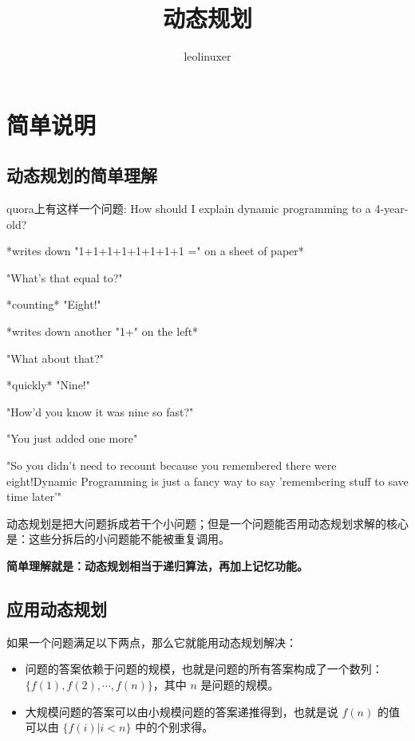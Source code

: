 \documentclass[12pt]{article}
\title{动态规划}
\author{leolinuxer}
\begin{document}
\maketitle
\tableofcontents

\section{简单说明}
\subsection{动态规划的简单理解 \cite{Simple_DynamicProgramming}}
quora上有这样一个问题: How should I explain dynamic programming to a 4-year-old?

*writes down "1+1+1+1+1+1+1+1 =" on a sheet of paper*

"What's that equal to?"

*counting* "Eight!"

*writes down another "1+" on the left*

"What about that?"

*quickly* "Nine!"

"How'd you know it was nine so fast?"

"You just added one more"

"So you didn't need to recount because you remembered there were eight!Dynamic Programming is just a fancy way to say 'remembering stuff to save time later'"

动态规划是把大问题拆成若干个小问题；但是一个问题能否用动态规划求解的核心是：这些分拆后的小问题能不能被重复调用。

\textbf{简单理解就是：动态规划相当于递归算法，再加上记忆功能。}

\subsection{应用动态规划\cite{Simple_DynamicProgramming-2}}
如果一个问题满足以下两点，那么它就能用动态规划解决：

\begin{itemize}[itemindent=2em]
    \item 问题的答案依赖于问题的规模，也就是问题的所有答案构成了一个数列：$\{f(1),f(2), \cdots, f(n)\}$，其中 $n$ 是问题的规模。
    
    \item 大规模问题的答案可以由小规模问题的答案递推得到，也就是说 $f(n)$ 的值可以由 $\{f(i)|i<n\}$ 中的个别求得。
\end{itemize}
\end{document}
